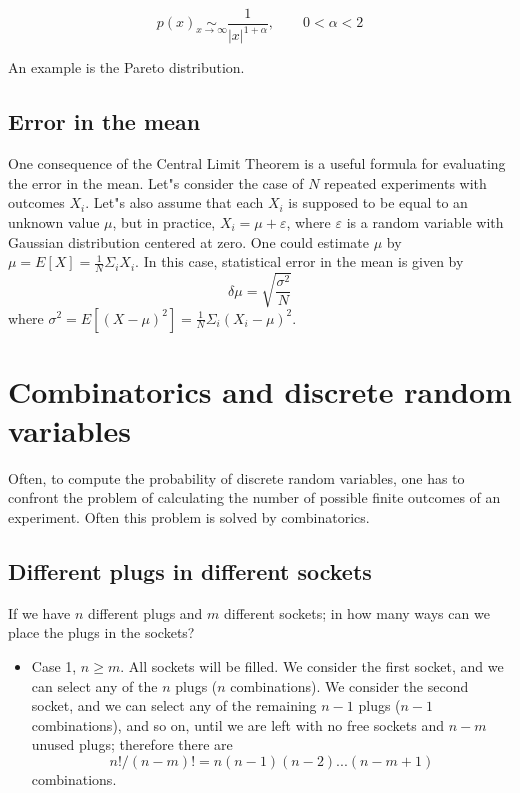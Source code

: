 \documentclass[justified, sixbynine]{tufte-book}
\def\stackunder#1#2{\mathrel{\mathop{#2}\limits_{#1}}}
\theoremstyle{plain}%
\newtheorem * {corollary}{Corollary}
\theoremstyle{definition}
\theoremstyle{remark}
\newtheorem * {remark}{Remark}
\newtheorem * {note}{Note}
\begin{document}
\begin{fullwidth}
\begin{equation}
p(x) \stackunder{x\rightarrow\infty}{\sim} \frac1{\left|x\right|^{1+\alpha}}, \qquad 0<\alpha<2
\end{equation}

An example is the Pareto distribution.

\goodbreak\subsection{Error in the mean}

One consequence of the Central Limit Theorem is a useful formula for evaluating the error in the mean.
Let"s consider the case of $N$ repeated experiments with outcomes $X_i$.
Let"s also assume that each $X_i$ is supposed to be equal to an unknown
value $\mu $, but in practice, $X_i=\mu +\varepsilon $, where $\varepsilon $ is
a random variable with Gaussian distribution centered at zero. One could
estimate $\mu $ by $\mu =E[X]=\frac 1N\Sigma _iX_i$.
In this case, statistical error in the mean is given by
\begin{equation}
\delta \mu =\sqrt{\frac{\sigma ^2}{N}}
\label{error}
\end{equation}
where $\sigma ^2=E[(X-\mu )^2]=\frac 1N\Sigma _i(X_i-\mu )^2$.



\goodbreak\section{Combinatorics and discrete random variables}

Often, to compute the probability of discrete random variables, one
has to confront the problem of calculating the number of possible finite
outcomes of an experiment. Often this problem is solved by combinatorics.

\goodbreak\subsection{Different plugs in different sockets}

If we have $n$ different plugs and $m$ different sockets; in how many ways
can we place the plugs in the sockets?

\begin{itemize}
\item  Case 1, $n\geq m$. All sockets will be filled. We consider the first
socket, and we can select any of the $n$ plugs ($n$ combinations). We
consider the second socket, and we can select any of the remaining $n-1$
plugs ($n-1$ combinations), and so on, until we are left with no free sockets
and $n-m$ unused plugs; therefore there are
\begin{equation}
n!/(n-m)!=n(n-1)(n-2)...(n-m+1)
\end{equation}
combinations.


\end{itemize}
\end{fullwidth}
\end{document}

